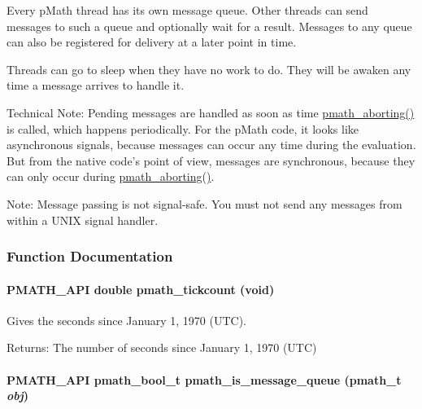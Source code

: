 Every pMath thread has its own message queue. Other threads can send messages to such a queue and optionally wait for a result. Messages to any queue can also be registered for delivery at a later point in time.

Threads can go to sleep when they have no work to do. They will be awaken any time a message arrives to handle it.

Technical Note: Pending messages are handled as soon as time \hyperlink{group__threads_gb75a9c87401fddb42b297ddb0495415f}{pmath\_\-aborting()} is called, which happens periodically. For the pMath code, it looks like asynchronous signals, because messages can occur any time during the evaluation. But from the native code's point of view, messages are synchronous, because they can only occur during \hyperlink{group__threads_gb75a9c87401fddb42b297ddb0495415f}{pmath\_\-aborting()}.

\begin{Desc}
\item[Note:]Message passing is not signal-safe. You must not send any messages from within a UNIX signal handler. \end{Desc}


\subsubsection{Function Documentation}
\hypertarget{group__threadmsg_geff0c8bdc4ab3fb6a0d8abb3ebf07532}{
\paragraph[{pmath\_\-tickcount}]{\setlength{\rightskip}{0pt plus 5cm}PMATH\_\-API double pmath\_\-tickcount (void)}\hfill}
\label{group__threadmsg_geff0c8bdc4ab3fb6a0d8abb3ebf07532}


Gives the seconds since January 1, 1970 (UTC). 

\begin{Desc}
\item[Returns:]The number of seconds since January 1, 1970 (UTC) \end{Desc}
\hypertarget{group__threadmsg_g93b45ad8c3063c94602c8bbaaf3c2613}{
\paragraph[{pmath\_\-is\_\-message\_\-queue}]{\setlength{\rightskip}{0pt plus 5cm}PMATH\_\-API {\bf pmath\_\-bool\_\-t} pmath\_\-is\_\-message\_\-queue ({\bf pmath\_\-t} {\em obj})}\hfill}
\label{group__threadmsg_g93b45ad8c3063c94602c8bbaaf3c2613}


